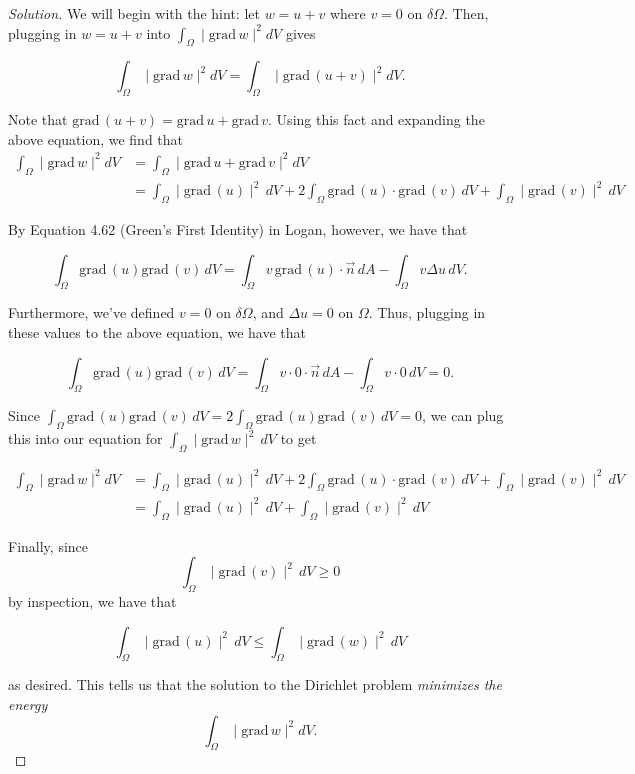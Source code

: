 \documentclass[11pt]{article}
\newenvironment{solution}
  {\renewcommand\qedsymbol{$\blacksquare$}\begin{proof}[Solution]}
  {\end{proof}}
\begin{document}
\begin{solution} 
We will begin with the hint: let $w = u + v$ where $v = 0$ on $\delta \Omega$. Then, plugging in $w = u + v$ into $\int_{\Omega} \mid \mathrm{grad} \, w \mid^2 dV$ gives

\[ \int_{\Omega} \mid \mathrm{grad} \, w \mid^2 dV = \int_{\Omega} \mid \mathrm{grad} \, (u+v) \mid^2 dV . \]

Note that $\mathrm{grad} \, (u+v) = \mathrm{grad} \, u + \mathrm{grad} \, v.$ Using this fact and expanding the above equation, we find that
\begin{align*} \int_{\Omega} \mid \mathrm{grad} \, w \mid^2 dV &= \int_{\Omega} \mid \mathrm{grad} \, u + \mathrm{grad} \, v \mid ^ 2 dV \\
&= \int_{\Omega} \mid \mathrm{grad} \, (u) \mid^2 \, dV + 2\int_{\Omega} \mathrm{grad} \, (u) \cdot \mathrm{grad} \, (v) \, dV + \int_{\Omega} \mid \mathrm{grad} \, (v) \mid^2 \, dV \end{align*}


By Equation 4.62 (Green's First Identity) in Logan, however, we have that

\[ \int_\Omega \mathrm{grad} \, (u) \mathrm{grad} \, (v) \, dV = \int_{\Omega} v \, \mathrm{grad} \, (u) \cdot \vec{n} \, dA - \int_{\Omega} v \Delta u\, dV. \]

Furthermore, we've defined $v = 0$ on $\delta \Omega$, and $\Delta u = 0$ on $\Omega$. Thus, plugging in these values to the above equation, we have that

\[ \int_\Omega \mathrm{grad} \, (u) \mathrm{grad} \, (v) \, dV = \int_{\Omega} v \cdot 0 \cdot \vec{n} \, dA - \int_{\Omega} v \cdot 0 \, dV = 0. \]

Since $\int_\Omega \mathrm{grad} \, (u) \mathrm{grad} \, (v) \, dV = 2 \int_\Omega \mathrm{grad} \, (u) \mathrm{grad} \, (v) \, dV = 0$, we can plug this into our equation for
$\int_\Omega \mid \mathrm{grad} \, w \mid ^2 \, dV$ to get

\begin{align*} \int_{\Omega} \mid \mathrm{grad} \, w \mid^2 dV &= \int_{\Omega} \mid \mathrm{grad} \, (u) \mid^2 \, dV + 2\int_{\Omega} \mathrm{grad} \, (u) \cdot \mathrm{grad} \, (v) \, dV + \int_{\Omega} \mid \mathrm{grad} \, (v) \mid^2 \, dV \\
&= \int_{\Omega} \mid \mathrm{grad} \, (u) \mid ^2 \, dV + \int_{\Omega} \mid \mathrm{grad} \, (v) \mid^2 \, dV\end{align*}

Finally, since \[ \int_{\Omega} \mid \mathrm{grad} \, (v)\mid ^2 \, dV \geq 0 \] by inspection, we have that

\[ \int_{\Omega} \mid \mathrm{grad} \, (u) \mid^2 \, dV \leq \int_{\Omega} \mid \mathrm{grad} \, (w) \mid^2 \, dV\]

as desired. This tells us that the solution to the Dirichlet problem \textit{minimizes the energy}
\[ \int_{\Omega} \mid \mathrm{grad} \, w \mid^2 dV. \] \end{solution}
\end{document}
